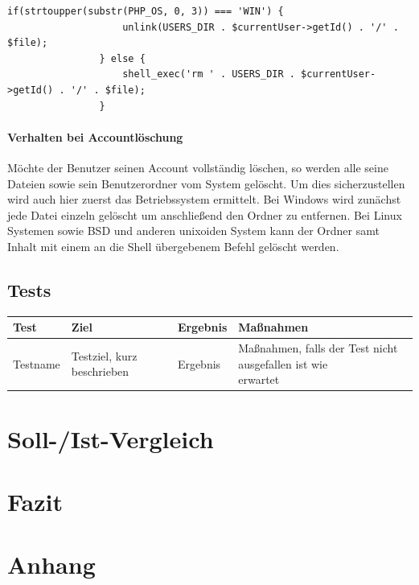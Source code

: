 \documentclass[10pt]{scrarticle}
\begin{document}
\begin{lstlisting}
if(strtoupper(substr(PHP_OS, 0, 3)) === 'WIN') {
                    unlink(USERS_DIR . $currentUser->getId() . '/' . $file);
                } else {
                    shell_exec('rm ' . USERS_DIR . $currentUser->getId() . '/' . $file);
                }
\end{lstlisting}

\paragraph{Verhalten bei Accountlöschung}
Möchte der Benutzer seinen Account vollständig löschen, so werden alle seine Dateien sowie sein Benutzerordner vom System gelöscht. Um dies sicherzustellen wird auch hier zuerst das Betriebssystem ermittelt. Bei Windows wird zunächst jede Datei einzeln gelöscht um anschließend den Ordner zu entfernen. Bei Linux Systemen sowie BSD und anderen unixoiden System kann der Ordner samt Inhalt mit einem an die Shell übergebenem Befehl gelöscht werden.

\subsection{Tests}

\begin{table}[ht!]
\begin{tabularx}{\textwidth}{l | l | l | l}

\textbf{Test}  & \textbf{Ziel}  & \textbf{Ergebnis} & \textbf{Maßnahmen}\\
\hline
Testname  & Testziel, kurz beschrieben  & Ergebnis & \makecell[l]{Maßnahmen, falls der Test nicht ausgefallen ist wie \\ erwartet}\\

\end{tabularx}
\end{table}

\section{Soll-/Ist-Vergleich}
\section{Fazit}
\section{Anhang}
\end{document}
